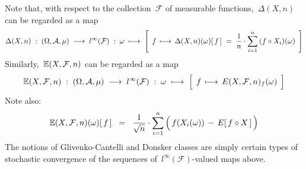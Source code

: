 \begin{remark}\mbox{}
\vskip 0.1cm
\noindent
Note that, with respect to the collection \,$\mathcal{F}$ of measurable functions,
\,$\Delta(X,n)$\, can be regarded as a map
\begin{equation*}
\Delta(X,n) \; : \; (\Omega,\mathcal{A},\mu) \;\longrightarrow\; l^{\infty}(\mathcal{F})
\; : \; \omega \;\longmapsto\;
	\left[\;\,
	f
	\,\overset{{\color{white}+}}{\longmapsto}\,
		\Delta(X,n)(\omega)[\,f\,]
		\;=\; \dfrac{1}{n}\cdot \overset{n}{\underset{i=1}{\sum}}\,(f \circ X_{i})(\omega)
	\,\;\right]
\end{equation*}
Similarly, \,$\mathbb{E}(X,\mathcal{F},n)$ can be regarded as a map
\begin{equation*}
\E(X,\mathcal{F},n) \; : \; (\Omega,\mathcal{A},\mu) \;\longrightarrow\; l^{\infty}(\mathcal{F})
\; : \; \omega \;\longmapsto\; \left[\;\, f \,\overset{{\color{white}+}}{\longmapsto}\, E(X,\mathcal{F},n)_{f}(\omega) \,\;\right]
\end{equation*}
Note also:
\begin{equation*}
\E(X,\mathcal{F},n)(\omega)[\,f\,]
\;\; = \;\;
	 \dfrac{1}{\sqrt{n}}
	 \cdot
	 \overset{n}{\underset{i=1}{\sum}}\left(\,f(X_{i}(\omega)) \,\overset{{\color{white}.}}{-}\, E[\,f \circ X\,]\,\right)
\end{equation*}
The notions of Glivenko-Cantelli and Donsker classes are simply certain types
of stochastic convergence of the sequences of \,$l^{\infty}(\mathcal{F})$-valued maps above.
\end{remark}

